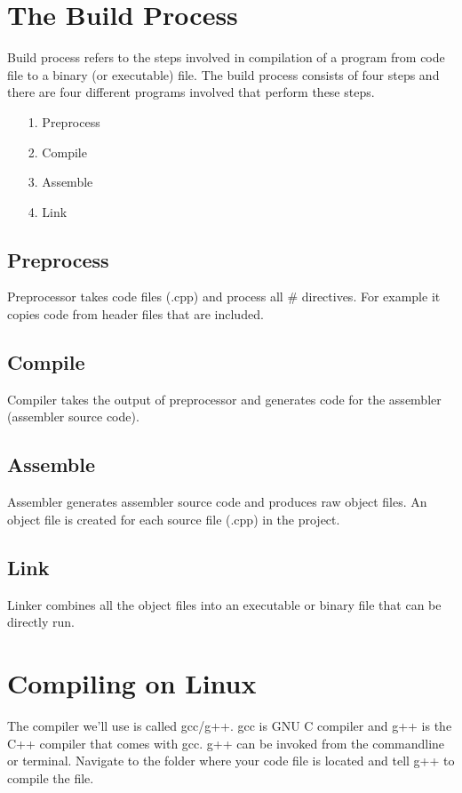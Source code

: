 \documentclass[12pt,a4paper]{article}
\begin{document}
\section{The Build Process}
Build process refers to the steps involved in compilation of a program from code file to a binary (or executable) file. The build process consists of four steps and there are four different programs involved that perform these steps.
\begin{itemize}
\item[1.] Preprocess
\item[2.] Compile
\item[3.] Assemble
\item[4.] Link 
\end{itemize}
\subsection{Preprocess}
Preprocessor takes code files (.cpp) and process all \# directives. For example it copies code from header files that are included.
\subsection{Compile}
Compiler takes the output of preprocessor and generates code for the assembler (assembler source code).
\subsection{Assemble}
Assembler generates assembler source code and produces raw object files. An object file is created for each source file (.cpp) in the project.
\subsection{Link}
Linker combines all the object files into an executable or binary file that can be directly run.
\section{Compiling on Linux}
The compiler we'll use is called gcc/g++. gcc is GNU C compiler and g++ is the C++ compiler that comes with gcc. g++ can be invoked from the commandline or terminal. Navigate to the folder where your code file is located and tell g++ to compile the file.
\end{document}
